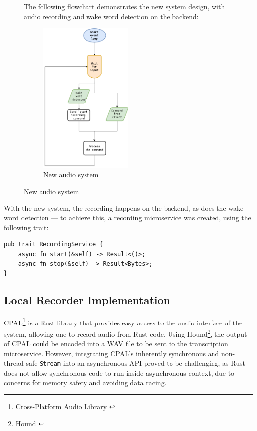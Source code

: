 \begin{figure}[H]
  The following flowchart demonstrates the new system design, with audio recording and wake word detection on the backend:
  \begin{figure}[H]
    \centering
    \includegraphics[width=0.5\textwidth]{assets/audio-new}
    \caption{New audio system}
    \label{chart:audio-new}
  \end{figure}
\end{figure}

With the new system, the recording happens on the backend, as does the wake word detection ---
to achieve this, a recording microservice was created, using the following trait:

\begin{verbatim}
pub trait RecordingService {
    async fn start(&self) -> Result<()>;
    async fn stop(&self) -> Result<Bytes>;
}
\end{verbatim}

\subsection{Local Recorder Implementation}
CPAL\footnote{Cross-Platform Audio Library \cite{cpal}} is a Rust library that provides easy access to the audio interface of the system,
allowing one to record audio from Rust code. Using Hound\footnote{Hound \cite{hound}}, the output of CPAL could be encoded into a WAV file
to be sent to the transcription microservice. However, integrating CPAL's inherently synchronous and non-thread safe \texttt{Stream} into an asynchronous API
proved to be challenging, as Rust does not allow synchronous code to run inside asynchronous context, due to concerns for memory safety and avoiding data racing.

